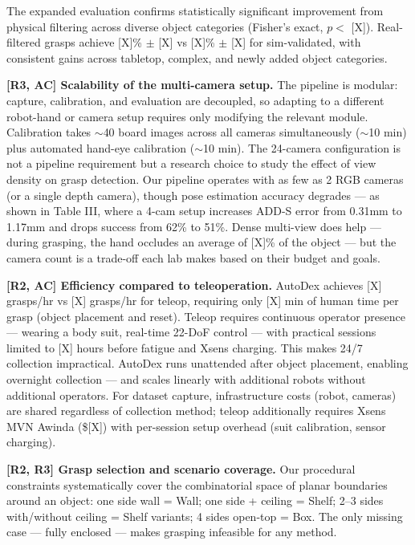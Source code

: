 \documentclass[conference]{IEEEtran}
\newcommand{\rtwo}{{\color{R2}R2}}
\newcommand{\rthree}{{\color{R3}R3}}
\newcommand{\acmark}{{\color{AC}AC}}
\newcommand{\rssparagraph}[1]{{\bf #1.}}
\begin{document}
The expanded evaluation confirms statistically significant improvement from physical filtering across diverse object categories (Fisher's exact, $p < $ [X]). Real-filtered grasps achieve [X]\% $\pm$ [X] vs [X]\% $\pm$ [X] for sim-validated, with consistent gains across tabletop, complex, and newly added object categories.

\rssparagraph{[\rthree, \acmark] Scalability of the multi-camera setup}
The pipeline is modular: capture, calibration, and evaluation are decoupled, so adapting to a different robot-hand or camera setup requires only modifying the relevant module. Calibration takes $\sim$40 board images across all cameras simultaneously ($\sim$10 min) plus automated hand-eye calibration ($\sim$10 min).
The 24-camera configuration is not a pipeline requirement but a research choice to study the effect of view density on grasp detection. Our pipeline operates with as few as 2 RGB cameras (or a single depth camera), though pose estimation accuracy degrades --- as shown in Table III, where a 4-cam setup increases ADD-S error from 0.31mm to 1.17mm and drops success from 62\% to 51\%. Dense multi-view does help --- during grasping, the hand occludes an average of [X]\% of the object --- but the camera count is a trade-off each lab makes based on their budget and goals.

\rssparagraph{[\rtwo, \acmark] Efficiency compared to teleoperation}
AutoDex achieves [X] grasps/hr vs [X] grasps/hr for teleop, requiring only [X] min of human time per grasp (object placement and reset). Teleop requires continuous operator presence --- wearing a body suit, real-time 22-DoF control --- with practical sessions limited to [X] hours before fatigue and Xsens charging. This makes 24/7 collection impractical. AutoDex runs unattended after object placement, enabling overnight collection --- and scales linearly with additional robots without additional operators. For dataset capture, infrastructure costs (robot, cameras) are shared regardless of collection method; teleop additionally requires Xsens MVN Awinda (\$[X]) with per-session setup overhead (suit calibration, sensor charging).

\rssparagraph{[\rtwo, \rthree] Grasp selection and scenario coverage}
\noindent[\rthree] Our procedural constraints systematically cover the combinatorial space of planar boundaries around an object: one side wall = Wall; one side + ceiling = Shelf; 2--3 sides with/without ceiling = Shelf variants; 4 sides open-top = Box. The only missing case --- fully enclosed --- makes grasping infeasible for any method.
\end{document}
